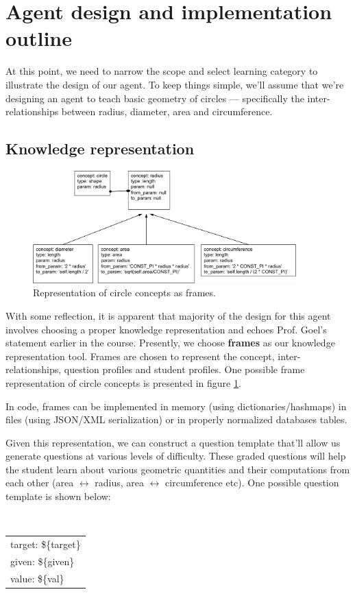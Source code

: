 \documentclass[10pt,letterpaper]{article}
\begin{document}
\section{Agent design and implementation outline}
At this point, we need to narrow the scope and select learning category to illustrate the design of our agent. To keep things simple, we'll assume that we're designing an agent to teach basic geometry of circles --- specifically the inter-relationships between radius, diameter, area and circumference. 

\subsection{Knowledge representation}
\begin{figure}[!htbp]
\centering
\includegraphics[width=4in]{./figures/fig1.png}
\caption{Representation of circle concepts as frames. \label{fig1}}
\end{figure}
With some reflection, it is apparent that majority of the design for this agent involves choosing a proper knowledge representation and echoes Prof. Goel's statement earlier in the course. Presently, we choose {\bf frames} as our knowledge representation tool. Frames are chosen to represent the concept, inter-relationships, question profiles and student profiles. One possible frame representation of circle concepts is presented in figure \ref{fig1}. 

In code, frames can be implemented in memory (using dictionaries/hashmaps) in files (using JSON/XML serialization) or in properly normalized databases tables.

Given this representation, we can construct a question template that'll allow us generate questions at various levels of difficulty. These graded questions will  help the student learn about various geometric quantities and their computations from each other (area $\leftrightarrow$ radius, area $\leftrightarrow$ circumference etc).  One possible question template is shown below:
\begin{center}
    {\tt
        \begin{tabular}{ |l|  }
          \hline
          target: \$\{target\} \\
          given: \$\{given\}\\
          value: \$\{val\}\\
          \hline  
        \end{tabular}
    }
\end{center}
\end{document}
